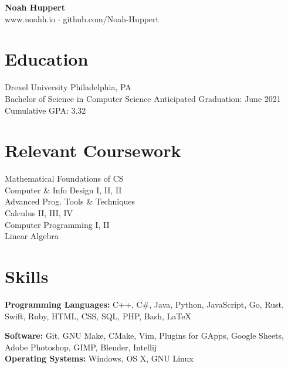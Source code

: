 \documentclass[10pt]{article}
\begin{document}
\centering
	\textbf{Noah Huppert} \\
	
	www.noahh.io $\cdot$ github.com/Noah-Huppert


\begin{flushleft}

\section{Education}
	Drexel University \hfill Philadelphia, PA \\
	Bachelor of Science in Computer Science \hfill Anticipated Graduation: June 2021 \\
	Cumulative GPA: 3.32

\section{Relevant Coursework}
	\begin{addmargin}[1em]{1em}
	\begin{multicols}{3}
		Mathematical Foundations of CS \\
		Computer \& Info Design I, II, II \\

		Advanced Prog. Tools \& Techniques \\
		Calculus II, III, IV \\

		Computer Programming I, II \\
		Linear Algebra 
	\end{multicols} 
	\end{addmargin}


\section{Skills}
	\textbf{Programming Languages:} C++, C\#, Java, Python, JavaScript, Go, Rust, Swift, Ruby, HTML, CSS, SQL, PHP, Bash, LaTeX

	\textbf{Software:} Git, GNU Make, CMake, Vim, Plugins for GApps, Google Sheets, Adobe Photoshop, GIMP, Blender, Intellij \\

	\textbf{Operating Systems:} Windows, OS X, GNU Linux


\end{flushleft}
\end{document}
